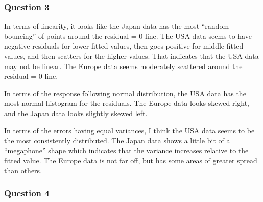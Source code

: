 \documentclass{article}
\begin{document}
    \subsubsection{Question 3}\label{question-3}

In terms of linearity, it looks like the Japan data has the most
``random bouncing'' of points around the residual = 0 line. The USA data
seems to have negative residuals for lower fitted values, then goes
positive for middle fitted values, and then scatters for the higher
values. That indicates that the USA data may not be linear. The Europe
data seems moderately scattered around the residual = 0 line.

In terms of the response following normal distribution, the USA data has
the most normal histogram for the residuals. The Europe data looks
skewed right, and the Japan data looks slightly skewed left.

In terms of the errors having equal variances, I think the USA data
seems to be the most consistently distributed. The Japan data shows a
little bit of a ``megaphone'' shape which indicates that the variance
increases relative to the fitted value. The Europe data is not far off,
but has some areas of greater spread than others.

    \subsubsection{Question 4}\label{question-4}
\end{document}
